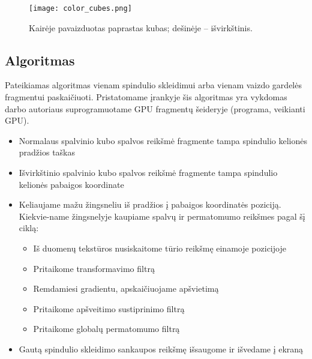 \begin{figure}[!ht]
\centering
\texttt{[image: color\_cubes.png]}
\caption{Kairėje pavaizduotas paprastas kubas; dešinėje -- išvirkštinis.}
\label{fig:color_cubes}
\end{figure}

\subsection{Algoritmas}

Pateikiamas algoritmas vienam spindulio skleidimui arba vienam vaizdo gardelės
fragmentui paskaičiuoti. Pristatomame įrankyje šis algoritmas yra vykdomas
darbo autoriaus suprogramuotame GPU fragmentų šeideryje (programa, veikianti
GPU).

\begin{itemize}

\item
Normalaus spalvinio kubo spalvos reikšmė fragmente tampa spindulio kelionės
pradžios taškas

\item
Išvirkštinio spalvinio kubo spalvos reikšmė fragmente tampa spindulio kelionės
pabaigos koordinate

\item
Keliaujame mažu žingsneliu iš pradžios į pabaigos koordinatės poziciją.
Kiekvie-name žingsnelyje kaupiame spalvų ir permatomumo reikšmes pagal šį
ciklą:

\begin{itemize}

\item
Iš duomenų tekstūros nusiskaitome tūrio reikšmę einamoje pozicijoje

\item
Pritaikome transformavimo filtrą

\item
Remdamiesi gradientu, apskaičiuojame apšvietimą

\item
Pritaikome apšveitimo sustiprinimo filtrą

\item
Pritaikome globalų permatomumo filtrą

\end{itemize}

\item
Gautą spindulio skleidimo sankaupos reikšmę išsaugome ir išvedame į ekraną

\end{itemize}

